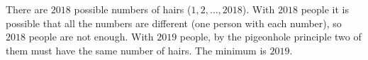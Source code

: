 There are $2018$ possible numbers of hairs ($1,2,\dots,2018$). With $2018$ people it is possible that all the numbers are different (one person with each number), so $2018$ people are not enough. With $2019$ people, by the pigeonhole principle two of them must have the same number of hairs. The minimum is $\boxed{2019}$.
